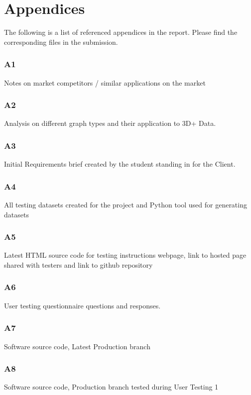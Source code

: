 \section{Appendices}
The following is a list of referenced appendices in the report. Please find the corresponding files in the submission.

\subsubsection{A1} \label{A1}
Notes on market competitors / similar applications on the market

\subsubsection{A2} \label{A2}
Analysis on different graph types and their application to 3D+ Data.

\subsubsection{A3} \label{A3}
Initial Requirements brief created by the student standing in for the Client.

\subsubsection{A4} \label{A4}
All testing datasets created for the project and Python tool used for generating datasets

\subsubsection{A5} \label{A5}
Latest HTML source code for testing instructions webpage, link to hosted page shared with testers and link to github repository

\subsubsection{A6} \label{A6}
User testing questionnaire questions and responses.

\subsubsection{A7} \label{A7}
Software source code, Latest Production branch

\subsubsection{A8} \label{A8}
Software source code, Production branch tested during User Testing 1

